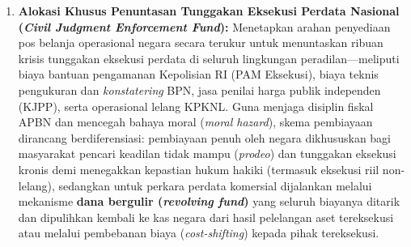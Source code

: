 \documentclass[12pt,a4paper,twocolumn]{article}
\begin{document}
\begin{enumerate}
    \item \textbf{Alokasi Khusus Penuntasan Tunggakan Eksekusi Perdata Nasional (\textit{Civil Judgment Enforcement Fund}):} Menetapkan arahan penyediaan pos belanja operasional negara secara terukur untuk menuntaskan ribuan krisis tunggakan eksekusi perdata di seluruh lingkungan peradilan—meliputi biaya bantuan pengamanan Kepolisian RI (PAM Eksekusi), biaya teknis pengukuran dan \textit{konstatering} BPN, jasa penilai harga publik independen (KJPP), serta operasional lelang KPKNL. Guna menjaga disiplin fiskal APBN dan mencegah bahaya moral (\textit{moral hazard}), skema pembiayaan dirancang berdiferensiasi: pembiayaan penuh oleh negara dikhususkan bagi masyarakat pencari keadilan tidak mampu (\textit{prodeo}) dan tunggakan eksekusi kronis demi menegakkan kepastian hukum hakiki (termasuk eksekusi riil non-lelang), sedangkan untuk perkara perdata komersial dijalankan melalui mekanisme \textbf{dana bergulir (\textit{revolving fund})} yang seluruh biayanya ditarik dan dipulihkan kembali ke kas negara dari hasil pelelangan aset tereksekusi atau melalui pembebanan biaya (\textit{cost-shifting}) kepada pihak tereksekusi.
\end{enumerate}
\end{document}
